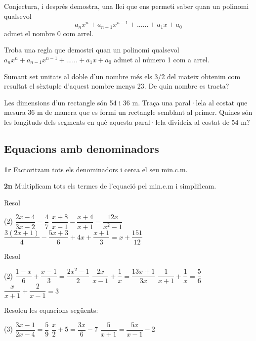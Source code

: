 \begin{mylist}
 \exer  Conjectura, i després demostra, una llei que ens permeti saber quan un polinomi qualsevol 
\[a_{n} x^{n} +a_{n-1} x^{n-1} +......+a_{1} x+a_{0} \] admet el nombre 0 com arrel.

\exer  Troba una regla que demostri quan un polinomi qualsevol $a_{n} x^{n} +a_{n-1} x^{n-1} +......+a_{1} x+a_{0}$ admet al número 1 com a arrel.


\exer  Sumant set unitats al doble d'un nombre més els 3/2 del mateix obtenim com resultat el sèxtuple d'aquest nombre menys 23. De quin nombre es tracta?

\exer  Les dimensions d'un rectangle són 54 i 36 m. Traça una paral·lela al costat que mesura 36 m de manera que es formi un rectangle semblant al primer. Quines són les longituds dels segments en què aquesta paral·lela divideix al costat de 54 m?

\end{mylist}


\subsection{Equacions amb denominadors}

\begin{theorybox}
	
	\textbf{1r} Factoritzam tots els denominadors i cerca el seu min.c.m. 
	
	\textbf{2n} Multiplicam tots els termes de l'equació pel min.c.m i simplificam.
\end{theorybox}

\begin{mylist}
	\exer Resol
	\begin{tasks}(2)
		\task $\dfrac{2x-4}{3x-2} =\dfrac{4}{7} $   \task $\dfrac{x+8}{x-1} -\dfrac{x+4}{x+1} =\dfrac{12x}{x^{2} -1} $   \task* $\dfrac{3(2x+1)}{4} -\dfrac{5x+3}{6} +4x+\dfrac{x+1}{3} =x+\dfrac{151}{12} $
	\end{tasks}
\answers{[$x=6$, $x=2$, $x=3$]}
	
\exer[1] Resol  
\begin{tasks}(2)
	\task $\dfrac{1-x}{6} +\dfrac{x-1}{3} =\dfrac{2x^{2} -1}{2} $  
	\task  $\dfrac{2x}{x-1} +\dfrac{1}{x} =\dfrac{13x+1}{3x} $
	\task $\dfrac{1}{x+1} +\dfrac{1}{x} =\dfrac{5}{6} $   
	\task  $\dfrac{x}{x+1} +\dfrac{2}{x-1} =3$
\end{tasks}
\answers[cols=2]{[ 
		 $x= \dfrac{2}{3},\,-\dfrac{1}{2}$,  $x=2,\,\dfrac{1}{7}$,  $x=2,\,-\dfrac{3}{5}$,  $\dfrac{1\pm \sqrt{41}}{4}$]}
 
\exer  Resoleu les equacions següents:
\begin{tasks}(3)
	\task $\dfrac{3x-1}{2x-4} =\dfrac{5}{9} $   \task $\dfrac{x}{2} +5=\dfrac{3x}{6} -7$   \task $\dfrac{5}{x+1} =\dfrac{5x}{x-1} -2$
\end{tasks}
\answers{[$x=-\dfrac{11}{17}$, $x=S.S.$, $x=S.S.$]}
\end{mylist}


